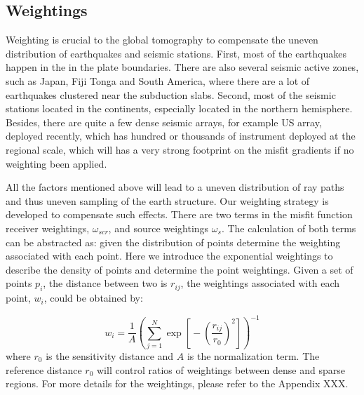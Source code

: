 \documentclass[extra,mreferee]{gji}
\begin{document}
\subsection{Weightings}
Weighting is crucial to the global tomography to compensate the uneven distribution
of earthquakes and seismic stations. First, most of the earthquakes happen in the
in the plate boundaries. There are also several seismic active zones, such as Japan,
Fiji Tonga and South America, where there are a lot of earthquakes clustered near
the subduction slabs.
Second, most of the seismic stations located in the continents, especially located in
the northern hemisphere. Besides, there are quite a few dense seismic arrays,
for example US array, deployed recently, which has hundred or thousands of instrument deployed
at the regional scale, which will has a very strong footprint on the misfit gradients if no weighting
been applied.

All the factors mentioned above will lead to a uneven distribution of
ray paths and thus uneven sampling of the earth structure. Our weighting strategy
is developed to compensate such effects. There are two terms in the misfit function
receiver weightings, $\omega_{scr}$, and source weightings $\omega_{s}$.
The calculation of both terms can be abstracted as: given the distribution of
points determine the weighting associated with each point.
Here we introduce the exponential weightings to describe the density of points and
determine the point weightings. Given a set of points $p_i$, the distance between
two is $r_{ij}$, the weightings associated with each point, $w_i$, could be obtained by:

\begin{equation}
w_{i} = \frac{1}{A} \left(
  \sum_{j=1}^N \exp \left[ \mbox{} - \left( \frac{r_{ij}} {r_{0}} \right)^2 \right] \right) ^{-1}
\label{eq:spatial_weights}
\end{equation}
where $r_{0}$ is the sensitivity distance and $A$ is the normalization term.
The reference distance $r_0$ will control ratios of weightings between dense and
sparse regions. For more details for the weightings, please refer to the Appendix XXX.
\end{document}
